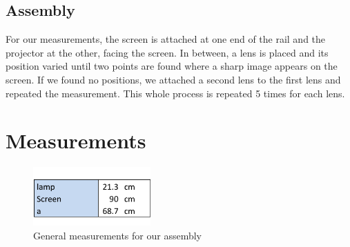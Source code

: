 \documentclass{scrreprt}
\begin{document}
\subsection{Assembly}
For our measurements, the screen is attached at one end of the rail and the projector at the other, facing the screen. In between, a lens is placed and its position varied until two points are found where a sharp image appears on the screen. If we found no positions, we attached a second lens to the first lens and repeated the measurement. This whole process is repeated 5 times for each lens.

\section{Measurements}

\begin{figure}[H]
	\centering
  \includegraphics[width=0.4\textwidth]{diag/general_measurements.pdf}
	\caption{General measurements for our assembly}
\end{figure}
\end{document}
